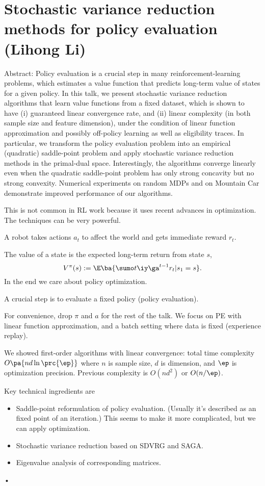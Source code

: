 \section{Stochastic variance reduction methods for policy evaluation (Lihong Li)}

Abstract: Policy evaluation is a crucial step in many reinforcement-learning problems, which estimates a value function that predicts long-term value of states for a given policy. In this talk, we present stochastic variance reduction algorithms that learn value functions from a fixed dataset, which is shown to have (i) guaranteed linear convergence rate, and (ii) linear complexity (in both sample size and feature dimension), under the condition of linear function approximation and possibly off-policy learning as well as eligibility traces. In particular, we transform the policy evaluation problem into an empirical (quadratic) saddle-point problem and apply stochastic variance reduction methods in the primal-dual space. Interestingly, the algorithms converge linearly even when the quadratic saddle-point problem has only strong concavity but no strong convexity. Numerical experiments on random MDPs and on Mountain Car demonstrate improved performance of our algorithms.

This is not common in RL work because it uses recent advances in optimization. The techniques can be very powerful.

A robot takes actions $a_t$ to affect the world and gets immediate reward $r_t$.

The value of a state is the expected long-term return from state $s$,
$$
V^\pi(s) := \E\ba{\sumo t{\iy}\ga^{t-1}r_t|s_1=s}.
$$
In the end we care about policy optimization.

A crucial step is to evaluate a fixed policy (policy evaluation). 

For convenience, drop $\pi$ and $a$ for the rest of the talk. We focus on PE with linear function approximation, and a batch setting where data is fixed (experience replay).

We showed first-order algorithms with linear convergence: total time complexity $O\pa{nd\ln \prc{\ep}}$ where $n$ is sample size, $d$ is dimension, and $\ep$ is optimization precision.
 Previous complexity is $O(nd^2)$ or $O(n/\ep)$.
 
 Key technical ingredients are
 \begin{itemize}
\item
Saddle-point reformulation of policy evaluation. (Usually it's described as an fixed point of an iteration.) This seems to make it more complicated, but we can apply optimization.
\item
Stochastic variance reduction based on SDVRG and SAGA.
\item
Eigenvalue analysis of corresponding matrices.
\end{itemize}•
 
